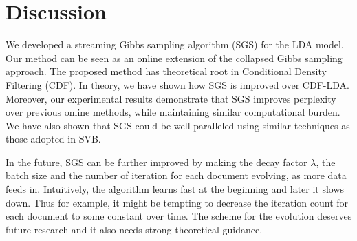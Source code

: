 \documentclass{article}
\begin{document}
\section{Discussion}
We developed a streaming Gibbs sampling algorithm (SGS) for the LDA model. Our method can be seen as an online extension of the collapsed Gibbs sampling approach. The proposed method has theoretical root in Conditional Density Filtering (CDF). In theory, we have shown how SGS is improved over CDF-LDA. Moreover, our experimental results demonstrate that SGS improves perplexity over previous online methods, while maintaining similar computational burden. We have also shown that SGS could be well paralleled using similar techniques as those adopted in SVB. 

In the future, SGS can be further improved by making the decay factor $\lambda$, the batch size and the number of iteration for each document evolving, as more data feeds in. Intuitively, the algorithm learns fast at the beginning and later it slows down. Thus for example, it might be tempting to decrease the iteration count for each document to some constant over time. The scheme for the evolution deserves future research and it also needs strong theoretical guidance. 




\end{document}
